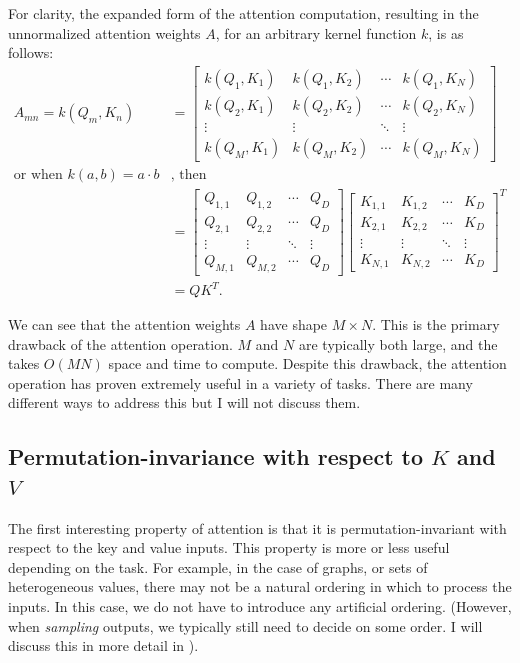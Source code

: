 For clarity, the expanded form of the attention computation, resulting in the unnormalized attention weights $A$, for an arbitrary kernel function $k$, is as follows:
\begin{align*}
A_{mn} = k(Q_m, K_n)
&= \begin{bmatrix}
    k(Q_{1}, K_{1}) & k(Q_{1}, K_{2}) & \cdots & k(Q_{1}, K_{N}) \\
    k(Q_{2}, K_{1}) & k(Q_{2}, K_{2}) & \cdots & k(Q_{2}, K_{N}) \\
    \vdots & \vdots & \ddots & \vdots \\
    k(Q_{M}, K_{1}) & k(Q_{M}, K_{2}) & \cdots & k(Q_{M}, K_{N})
\end{bmatrix} \\
\text{or when\ } k(a, b) = a \cdot b &\text{, then} \\
&= \begin{bmatrix}
    Q_{1,1} & Q_{1,2} & \cdots & Q_D \\
    Q_{2,1} & Q_{2,2} & \cdots & Q_D \\
    \vdots & \vdots & \ddots & \vdots \\
    Q_{M,1} & Q_{M,2} & \cdots & Q_D
\end{bmatrix} \begin{bmatrix}
    K_{1,1} & K_{1,2} & \cdots & K_D \\
    K_{2,1} & K_{2,2} & \cdots & K_D \\
    \vdots & \vdots & \ddots & \vdots \\
    K_{N,1} & K_{N,2} & \cdots & K_D
\end{bmatrix}^T \\
&= Q K^T .
\end{align*}

We can see that the attention weights $A$ have shape $M×N$. This is the primary drawback of the attention operation. $M$ and $N$ are typically both large, and the takes $O(MN)$ space and time to compute. Despite this drawback, the attention operation has proven extremely useful in a variety of tasks. There are many different ways to address this but I will not discuss them.

\subsection{Permutation-invariance with respect to $K$ and $V$}

The first interesting property of attention is that it is permutation-invariant with respect to the key and value inputs. This property is more or less useful depending on the task. For example, in the case of graphs, or sets of heterogeneous values, there may not be a natural ordering in which to process the inputs. In this case, we do not have to introduce any artificial ordering. (However, when \textit{sampling} outputs, we typically still need to decide on some order. I will discuss this in more detail in ).

